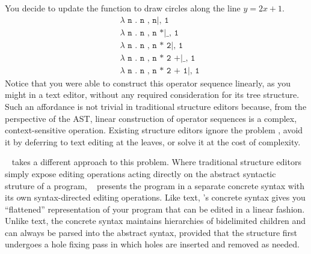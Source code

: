 You decide to update the function to draw circles along the
line $y = 2x + 1$.
\begin{align*}
  & \texttt{$\lambda$ n . n , n|, 1} \\
  & \texttt{$\lambda$ n . n , n *|\_ , 1} \\
  & \texttt{$\lambda$ n . n , n * 2|, 1} \\
  & \texttt{$\lambda$ n . n , n * 2 +|\_ , 1} \\
  & \texttt{$\lambda$ n . n , n * 2 + 1|, 1}
\end{align*}
Notice that you were able to construct this operator sequence
linearly, as you might in a text editor, without any
required consideration for its tree structure.
Such an affordance is not trivial
in traditional structure editors because,
from the perspective of the AST, linear construction of
operator sequences is a complex, context-sensitive operation.
Existing structure editors ignore the problem ,
avoid it by deferring to text editing at the leaves,
or solve it at the cost of complexity.


\tylr~ takes a different approach to this problem.
Where traditional structure editors simply expose editing
operations acting directly on the abstract syntactic struture
of a program, \tylr~ presents the program in a separate
concrete syntax with its own syntax-directed editing operations.
Like text, \tylr's concrete syntax gives you ``flattened''
representation of your program that can be edited in a linear fashion.
Unlike text, the concrete syntax maintains hierarchies of
bidelimited children and can always be parsed into
the abstract syntax, provided that the structure first undergoes
a hole fixing pass in which holes are inserted and removed
as needed. 


